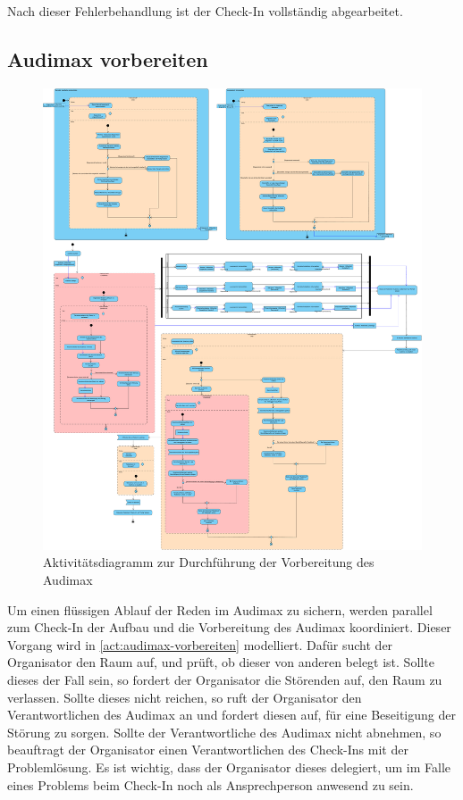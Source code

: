 Nach dieser Fehlerbehandlung ist der Check-In vollständig abgearbeitet.

\subsection{Audimax vorbereiten}
\begin{figure}[ht!]
    \centering
    \includegraphics[width=0.7\columnwidth]{Bilder/act_Audimax_vorbereiten.pdf}
    \caption{Aktivitätsdiagramm zur Durchführung der Vorbereitung des Audimax}
    \label{act:audimax-vorbereiten}
\end{figure}

Um einen flüssigen Ablauf der Reden im Audimax zu sichern, werden parallel zum Check-In der Aufbau und die Vorbereitung des Audimax koordiniert. Dieser Vorgang wird in \autoref{act:audimax-vorbereiten} modelliert. Dafür sucht der Organisator den Raum auf, und prüft, ob dieser von anderen belegt ist. Sollte dieses der Fall sein, so fordert der Organisator die Störenden auf, den Raum zu verlassen. Sollte dieses nicht reichen, so ruft der Organisator den Verantwortlichen des Audimax an und fordert diesen auf, für eine Beseitigung der Störung zu sorgen. Sollte der Verantwortliche des Audimax nicht abnehmen, so beauftragt der Organisator einen Verantwortlichen des Check-Ins mit der Problemlösung. Es ist wichtig, dass der Organisator dieses delegiert, um im Falle eines Problems beim Check-In noch als Ansprechperson anwesend zu sein.

